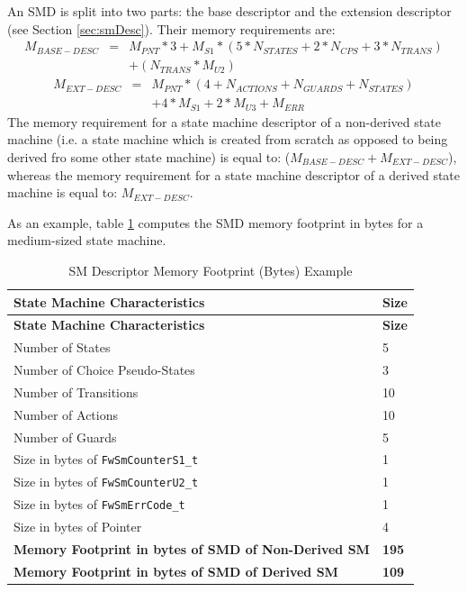 \documentclass[a4paper,10pt]{article}
\begin{document}
An SMD is split into two parts: the base descriptor and the extension descriptor (see Section \ref{sec:smDesc}). 
Their memory requirements are:
\begin{eqnarray*}
M_{BASE-DESC} & = & M_{PNT} * 3 + M_{S1} * (5 * N_{STATES} + 2 * N_{CPS} + 3 * N_{TRANS}) \\
              &   & + (N_{TRANS} * M_{U2}) 
\end{eqnarray*}
\begin{eqnarray*}
M_{EXT-DESC} & = & M_{PNT} * (4 + N_{ACTIONS} + N_{GUARDS} + N_{STATES}) \\
             &   & + 4 * M_{S1} + 2 * M_{U3} + M_{ERR}
\end{eqnarray*}
The memory requirement for a state machine descriptor of a non-derived state machine (i.e. a state machine which 
is created from scratch as opposed to being derived fro some other state machine) is equal to: 
($M_{BASE-DESC} + M_{EXT-DESC}$), whereas the memory requirement for a state machine descriptor of a derived state 
machine is equal to: $M_{EXT-DESC}$.

As an example, table \ref{tab:smdMemFootprintExample} computes the SMD memory footprint in bytes for a 
medium-sized state machine. 

\begin{longtable}{|p{10.0cm}|p{1.2cm}|}
\caption{SM Descriptor Memory Footprint (Bytes) Example} \label{tab:smdMemFootprintExample}\\
\hline
\rowcolor{gray}
\textbf{State Machine Characteristics} & \textbf{Size} \\
\hline\hline
\endfirsthead
\rowcolor{gray}
\textbf{State Machine Characteristics} & \textbf{Size} \\
\hline\hline
\endhead
Number of States & 5 \\
\hline
Number of Choice Pseudo-States & 3 \\
\hline
Number of Transitions & 10 \\
\hline
Number of Actions & 10 \\
\hline
Number of Guards & 5 \\
\hline
Size in bytes of \texttt{FwSmCounterS1\_t} & 1 \\
\hline
Size in bytes of \texttt{FwSmCounterU2\_t} & 1 \\
\hline
Size in bytes of \texttt{FwSmErrCode\_t} & 1 \\
\hline
Size in bytes of Pointer & 4 \\
\hline
\textbf{Memory Footprint in bytes of SMD of Non-Derived SM} & \textbf{195} \\
\hline
\textbf{Memory Footprint in bytes of SMD of Derived SM} & \textbf{109} \\
\hline
\end{longtable}
\end{document}
